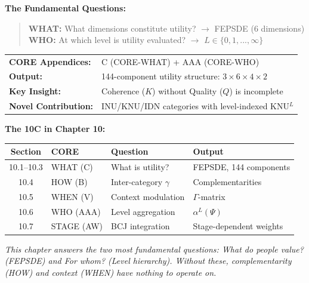 \begin{tcolorbox}[
    colback=red!5!white,
    colframe=red!75!black,
    title={\textbf{10C CORE Connection: WHAT (Question 3) + WHO (Question 1)}},
    fonttitle=\bfseries
]
\textbf{The Fundamental Questions:}
\begin{quote}
\textbf{WHAT:} What dimensions constitute utility? $\rightarrow$ FEPSDE (6 dimensions)\\
\textbf{WHO:} At which level is utility evaluated? $\rightarrow$ $L \in \{0, 1, ..., \infty\}$
\end{quote}

\medskip
\begin{tabular}{ll}
\textbf{CORE Appendices:} & C (CORE-WHAT) + AAA (CORE-WHO) \\
\textbf{Output:} & 144-component utility structure: $3 \times 6 \times 4 \times 2$ \\
\textbf{Key Insight:} & Coherence ($K$) without Quality ($Q$) is incomplete \\
\textbf{Novel Contribution:} & INU/KNU/IDN categories with level-indexed KNU$^L$
\end{tabular}

\medskip
\textbf{The 10C in Chapter 10:}
\begin{center}
\small
\begin{tabular}{@{}clll@{}}
\toprule
\textbf{Section} & \textbf{CORE} & \textbf{Question} & \textbf{Output} \\
\midrule
10.1--10.3 & WHAT (C) & What is utility? & FEPSDE, 144 components \\
10.4 & HOW (B) & Inter-category $\gamma$ & Complementarities \\
10.5 & WHEN (V) & Context modulation & $\Gamma$-matrix \\
10.6 & WHO (AAA) & Level aggregation & $\alpha^L(\Psi)$ \\
10.7 & STAGE (AW) & BCJ integration & Stage-dependent weights \\
\bottomrule
\end{tabular}
\end{center}

\textit{This chapter answers the two most fundamental questions: What do people value? (FEPSDE) and For whom? (Level hierarchy). Without these, complementarity (HOW) and context (WHEN) have nothing to operate on.}
\end{tcolorbox}

